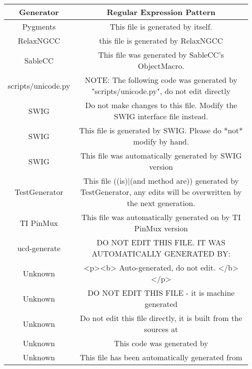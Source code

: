 \setlength{\extrarowheight}{0.2em}
\begin{table}
	\label{table:generatorPatternRepository_Git_01}
	\begin{tabularx}{\textwidth}{c|C}
		\textbf{Generator} & \textbf{Regular Expression Pattern} \\
		\hline
		Pygments & This file is generated by itself. \\
		RelaxNGCC & this file is generated by RelaxNGCC \\
		SableCC & This file was generated by SableCC's ObjectMacro. \\
		scripts/unicode.py & NOTE: The following code was generated by "scripts/unicode.py", do not edit directly \\
		SWIG & Do not make changes to this file. Modify the SWIG interface file instead. \\
		SWIG & This file is generated by SWIG. Please do *not* modify by hand. \\
		SWIG & This file was automatically generated by SWIG version \version \\
		TestGenerator & This file ((is)|(and method are)) generated by TestGenerator, any edits will be overwritten by the next generation. \\
		TI PinMux & This file was automatically generated on \timestamp by TI PinMux version \version \\
		ucd-generate & DO NOT EDIT THIS FILE. IT WAS AUTOMATICALLY GENERATED BY: \\
		Unknown & <p><b> Auto-generated, do not edit. </b></p> \\
		Unknown & DO NOT EDIT THIS FILE - it is machine generated \\
		Unknown & Do not edit this file directly, it is built from the sources at \link \\
		Unknown & This code was generated by \\
		Unknown & This file has been automatically generated from \class \\	
	\end{tabularx}
\end{table}
\setlength{\extrarowheight}{0em}